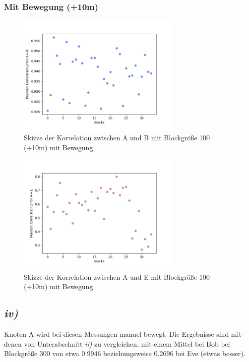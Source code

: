 \documentclass[12pt,a4paper]{article}
\begin{document}
\subsubsection*{Mit Bewegung (+10m)}


\begin{figure}[hbt!]
	\centering
		\includegraphics[width=0.7\textwidth ]
		{Bilder/a3-t3b-mb-block100-correlation-AB.png}
		\caption{Skizze der Korrelation zwischen A und B mit Blockgröße 100 (+10m) mit Bewegung}
		\label{fig:Label14}
\end{figure}

\begin{figure}[hbt!]
	\centering
		\includegraphics[width=0.7\textwidth ]
		{Bilder/a3-t3b-mb-block100-correlation-AE.png}
		\caption{Skizze der Korrelation zwischen A und E mit Blockgröße 100 (+10m) mit Bewegung}
		\label{fig:Label15}
\end{figure}


\subsection*{\textit{iv)}}

Knoten A wird bei diesen Messungen manuel bewegt. Die Ergebnisse
sind mit denen von Unterabschnitt \textit{ii)} zu vergleichen, mit 
einem Mittel bei Bob bei Blockgröße 300 von etwa 0.9946 
beziehungsweise 0.2696 bei Eve (etwas besser).
\end{document}

